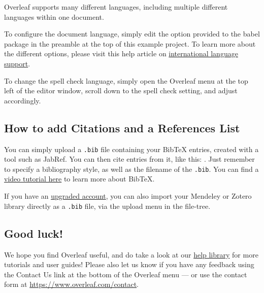 \documentclass{article}
\begin{document}
Overleaf supports many different languages, including multiple different languages within one document. 

To configure the document language, simply edit the option provided to the babel package in the preamble at the top of this example project. To learn more about the different options, please visit this help article on \href{https://www.overleaf.com/learn/latex/International_language_support}{international language support}.

To change the spell check language, simply open the Overleaf menu at the top left of the editor window, scroll down to the spell check setting, and adjust accordingly.

\subsection{How to add Citations and a References List}

You can simply upload a \verb|.bib| file containing your BibTeX entries, created with a tool such as JabRef. You can then cite entries from it, like this: \cite{greenwade93}. Just remember to specify a bibliography style, as well as the filename of the \verb|.bib|. You can find a \href{https://www.overleaf.com/help/97-how-to-include-a-bibliography-using-bibtex}{video tutorial here} to learn more about BibTeX.

If you have an \href{https://www.overleaf.com/user/subscription/plans}{upgraded account}, you can also import your Mendeley or Zotero library directly as a \verb|.bib| file, via the upload menu in the file-tree.

\subsection{Good luck!}

We hope you find Overleaf useful, and do take a look at our \href{https://www.overleaf.com/learn}{help library} for more tutorials and user guides! Please also let us know if you have any feedback using the Contact Us link at the bottom of the Overleaf menu --- or use the contact form at \url{https://www.overleaf.com/contact}.



\end{document}
